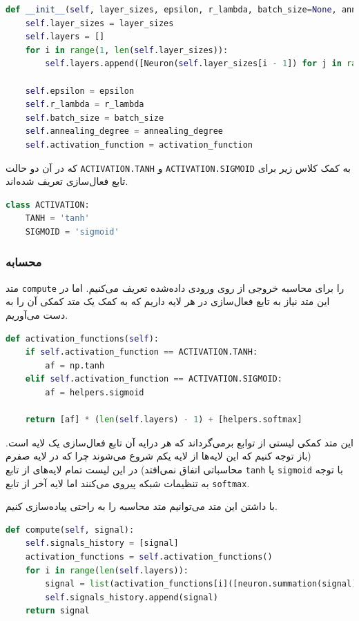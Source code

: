 \documentclass[a4paper, 12pt]{article}
\theoremstyle{definition}
\begin{document}
\LTR
\begin{lstlisting}[language=Python]
def __init__(self, layer_sizes, epsilon, r_lambda, batch_size=None, annealing_degree=0, activation_function=ACTIVATION.TANH):
    self.layer_sizes = layer_sizes
    self.layers = []
    for i in range(1, len(self.layer_sizes)):
        self.layers.append([Neuron(self.layer_sizes[i - 1]) for j in range(self.layer_sizes[i])])

    self.epsilon = epsilon
    self.r_lambda = r_lambda
    self.batch_size = batch_size
    self.annealing_degree = annealing_degree
    self.activation_function = activation_function
\end{lstlisting}
\RTL

که در آن دو حالت
\texttt{ACTIVATION.TANH}
و
\texttt{ACTIVATION.SIGMOID}
به کمک کلاس زیر برای تابع فعال‌سازی تعریف شده‌اند.

\LTR
\begin{lstlisting}[language=Python]
class ACTIVATION:
    TANH = 'tanh'
    SIGMOID = 'sigmoid'
\end{lstlisting}
\RTL

\subsubsection{محسابه}
متد
\texttt{compute}
را برای محاسبه خروجی از روی ورودی داده‌شده تعریف می‌کنیم. اما در این متد نیاز به تابع فعال‌سازی در هر لایه داریم که به کمک یک متد کمکی آن را به دست می‌آوریم.

\LTR
\begin{lstlisting}[language=Python]
def activation_functions(self):
    if self.activation_function == ACTIVATION.TANH:
        af = np.tanh
    elif self.activation_function == ACTIVATION.SIGMOID:
        af = helpers.sigmoid

    return [af] * (len(self.layers) - 1) + [helpers.softmax]
\end{lstlisting}
\RTL

این متد کمکی لیستی از توابع برمی‌گرداند که هر درایه آن تابع فعال‌سازی یک لایه است. (باز توجه کنیم که این لایه‌ها از لایه یکم شروع می‌شوند چرا که در لایه صفرم محاسباتی اتفاق نمی‌افتد) در این لیست تمام لایه‌های از تابع
\texttt{tanh}
یا
\texttt{sigmoid}
با توجه به تنظیمات شبکه پیروی می‌کنند اما لایه آخر از تابع
\texttt{softmax}.

با داشتن این متد می‌توانیم متد محاسبه را به راحتی پیاده‌سازی کنیم.

\LTR
\begin{lstlisting}[language=Python]
def compute(self, signal):
    self.signals_history = [signal]
    activation_functions = self.activation_functions()
    for i in range(len(self.layers)):
        signal = list(activation_functions[i]([neuron.summation(signal) for neuron in self.layers[i]]))
        self.signals_history.append(signal)
    return signal
\end{lstlisting}
\RTL
\end{document}
